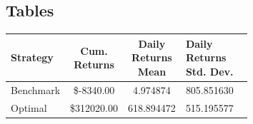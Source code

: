 \documentclass[
	letterpaper, %
]{jdf}
\begin{document}
\subsection{Tables}
\begin{jdftable}
\label{table:Example}
\small %
\begin{tabular}{@{} L{0.15\linewidth} c S L{0.52\linewidth}}
    \textbf{Strategy} & \textbf{Cum. Returns} & \textbf{Daily Returns Mean} & \textbf{Daily Returns Std. Dev.} \\
    \toprule[0.5pt]
    Benchmark & \$-8340.00 & 4.974874 & 805.851630\\
    \midrule
    Optimal & \$312020.00 & 618.894472 &  515.195577\\
    \midrule
\end{tabular}
\end{jdftable}
    
\end{document}
